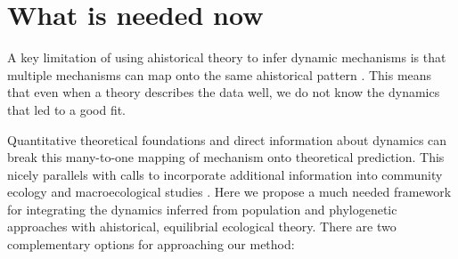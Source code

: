 \documentclass[12pt]{article}
\begin{document}
\section{What is needed now}

A key limitation of using ahistorical theory to infer dynamic
mechanisms is that multiple mechanisms can map onto the same ahistorical pattern \citep{Kendall1948-pj, Kendall1948-ri,
  Engen1996-jt, Engen1996-na, McGill2003-sf}.  This means that even
when a theory describes the data well, we do not know the
dynamics that led to a good fit. 
% 
% 

Quantitative theoretical foundations and direct information about
dynamics can break this many-to-one mapping of mechanism onto
theoretical prediction. This nicely parallels with calls to incorporate
additional information into community ecology and macroecological
studies \citep{McGill2007-zd}. Here we propose a much needed framework for
% 
% 
% 
% 
integrating the dynamics inferred from population and phylogenetic
approaches with ahistorical, equilibrial ecological theory. There are
two complementary options for approaching our method:
\end{document}
